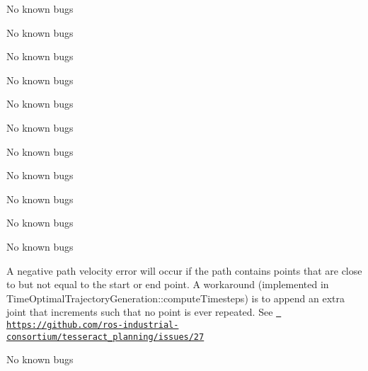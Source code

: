 \begin{DoxyRefList}
\label{bug__bug000173}%
%
No known bugs 
\item[File \mbox{\hyperlink{task__input_8cpp}{task\+\_\+input.cpp}} ]\label{bug__bug000212}%
%
No known bugs 
\item[File \mbox{\hyperlink{task__input_8h}{task\+\_\+input.h}} ]\label{bug__bug000174}%
%
No known bugs 
\item[File \mbox{\hyperlink{taskflow__container_8cpp}{taskflow\+\_\+container.cpp}} ]\label{bug__bug000213}%
%
No known bugs 
\item[File \mbox{\hyperlink{taskflow__container_8h}{taskflow\+\_\+container.h}} ]\label{bug__bug000175}%
%
No known bugs 
\item[File \mbox{\hyperlink{taskflow__generator_8h}{taskflow\+\_\+generator.h}} ]\label{bug__bug000176}%
%
No known bugs 
\item[File \mbox{\hyperlink{taskflow__interface_8h}{taskflow\+\_\+interface.h}} ]\label{bug__bug000214}%
%
No known bugs

\label{bug__bug000177}%
%
No known bugs 
\item[File \mbox{\hyperlink{taskflow__profiling__example_8cpp}{taskflow\+\_\+profiling\+\_\+example.cpp}} ]\label{bug__bug000165}%
%
No known bugs 
\item[File \mbox{\hyperlink{taskflow__visualization__utils_8h}{taskflow\+\_\+visualization\+\_\+utils.h}} ]\label{bug__bug000204}%
%
No known bugs 
\item[File \mbox{\hyperlink{tesseract__common__trajectory_8cpp}{tesseract\+\_\+common\+\_\+trajectory.cpp}} ]\label{bug__bug000247}%
%
No known bugs 
\item[Member \mbox{\hyperlink{classtesseract__planning_1_1totg_1_1Trajectory_a78d9b62367b7178b2d23eaf185969319}{tesseract\+\_\+planning\+::totg\+::Trajectory\+::Trajectory}} (const \mbox{\hyperlink{classtesseract__planning_1_1totg_1_1Path}{Path}} \&path, const Eigen\+::\+Vector\+Xd \&max\+\_\+velocity, const Eigen\+::\+Vector\+Xd \&max\+\_\+acceleration, double time\+\_\+step=0.\+001)]\label{bug__bug000243}%
%
A negative path velocity error will occur if the path contains points that are close to but not equal to the start or end point. A workaround (implemented in Time\+Optimal\+Trajectory\+Generation\+::compute\+Timesteps) is to append an extra joint that increments such that no point is ever repeated. See \href{https://github.com/ros-industrial-consortium/tesseract_planning/issues/27}{\texttt{ https\+://github.\+com/ros-\/industrial-\/consortium/tesseract\+\_\+planning/issues/27}}  
\item[File \mbox{\hyperlink{time__optimal__trajectory__generation__task__generator_8h}{time\+\_\+optimal\+\_\+trajectory\+\_\+generation\+\_\+task\+\_\+generator.h}} ]\label{bug__bug000224}%
%
No known bugs


\end{DoxyRefList}
